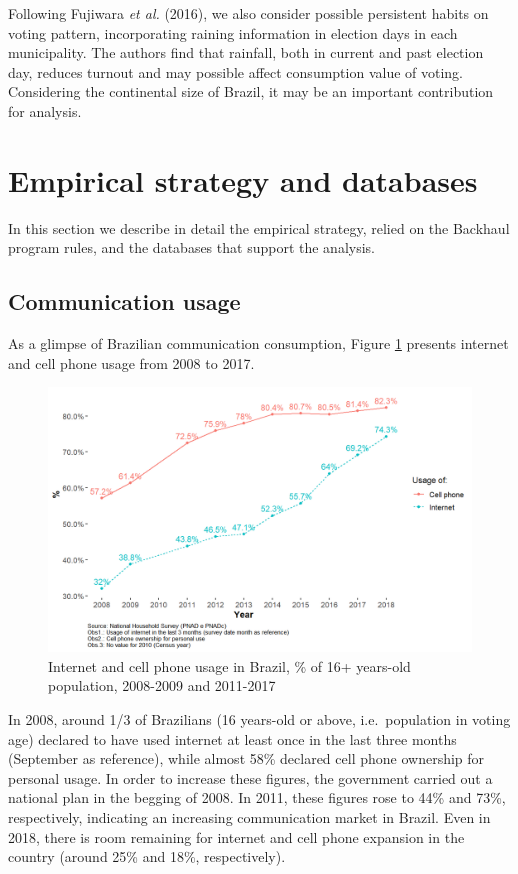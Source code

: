 \documentclass[
  12pt,
]{article}
\begin{document}
Following Fujiwara \emph{et al.} (2016), we also consider possible
persistent habits on voting pattern, incorporating raining information
in election days in each municipality. The authors find that rainfall,
both in current and past election day, reduces turnout and may possible
affect consumption value of voting. Considering the continental size of
Brazil, it may be an important contribution for analysis.

\hypertarget{empirical-strategy-and-databases}{%
\section{Empirical strategy and
databases}\label{empirical-strategy-and-databases}}

In this section we describe in detail the empirical strategy, relied on
the Backhaul program rules, and the databases that support the analysis.

\hypertarget{communication-usage}{%
\subsection{Communication usage}\label{communication-usage}}

As a glimpse of Brazilian communication consumption, Figure \ref{fig:0}
presents internet and cell phone usage from 2008 to 2017.

\begin{figure}
\centering
\includegraphics{artigo1_files/figure-latex/internet_usage-1.png}
\caption{Internet and cell phone usage in Brazil, \% of 16+ years-old
population, 2008-2009 and 2011-2017 \label{fig:0}}
\end{figure}

In 2008, around 1/3 of Brazilians (16 years-old or above,
i.e.~population in voting age) declared to have used internet at least
once in the last three months (September as reference), while almost
58\% declared cell phone ownership for personal usage. In order to
increase these figures, the government carried out a national plan in
the begging of 2008. In 2011, these figures rose to 44\% and 73\%,
respectively, indicating an increasing communication market in Brazil.
Even in 2018, there is room remaining for internet and cell phone
expansion in the country (around 25\% and 18\%, respectively).
\end{document}
